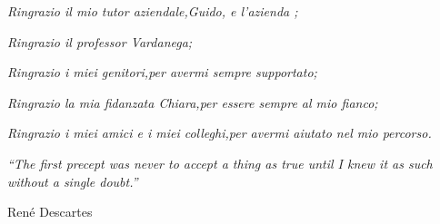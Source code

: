\setlength{}
\setlength\epigraphrule{0pt}

\begin{flushright}
   \large{\textit{Ringrazio il mio tutor aziendale,\linebreak Guido, e l'azienda \nomeAzienda{};}}
\end{flushright}

\begin{flushright}
   \large{\textit{Ringrazio il professor Vardanega;}}
\end{flushright}

\begin{flushright}
   \large{\textit{Ringrazio i miei genitori,\linebreak per avermi sempre supportato;}}
\end{flushright}

\begin{flushright}
   \large{\textit{Ringrazio la mia fidanzata Chiara,\linebreak per essere sempre al mio fianco;}}
\end{flushright}

\begin{flushright}
   \large{\textit{Ringrazio i miei amici e i miei colleghi,\linebreak per avermi aiutato nel mio percorso.}}
\end{flushright}

\vspace*{\fill}

\epigraph{\textit{``The first precept was never to accept a thing as true until I knew it as such without a single doubt.''}}{René Descartes}